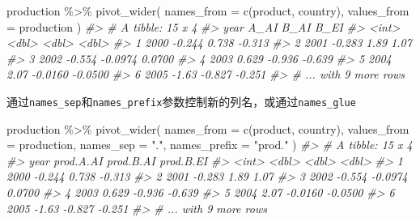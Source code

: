 \documentclass[
]{book}
\newenvironment{Shaded}{\begin{snugshade}}{\end{snugshade}}
\newcommand{\AttributeTok}[1]{\textcolor[rgb]{0.77,0.63,0.00}{#1}}
\newcommand{\CommentTok}[1]{\textcolor[rgb]{0.56,0.35,0.01}{\textit{#1}}}
\newcommand{\FunctionTok}[1]{\textcolor[rgb]{0.00,0.00,0.00}{#1}}
\newcommand{\NormalTok}[1]{#1}
\newcommand{\SpecialCharTok}[1]{\textcolor[rgb]{0.00,0.00,0.00}{#1}}
\newcommand{\StringTok}[1]{\textcolor[rgb]{0.31,0.60,0.02}{#1}}
\begin{document}
\begin{Shaded}
\begin{Highlighting}[]
\NormalTok{production }\SpecialCharTok{\%\textgreater{}\%} \FunctionTok{pivot\_wider}\NormalTok{(}
  \AttributeTok{names\_from =} \FunctionTok{c}\NormalTok{(product, country), }
  \AttributeTok{values\_from =}\NormalTok{ production}
\NormalTok{)}
\CommentTok{\#\textgreater{} \# A tibble: 15 x 4}
\CommentTok{\#\textgreater{}    year   A\_AI    B\_AI    B\_EI}
\CommentTok{\#\textgreater{}   \textless{}int\textgreater{}  \textless{}dbl\textgreater{}   \textless{}dbl\textgreater{}   \textless{}dbl\textgreater{}}
\CommentTok{\#\textgreater{} 1  2000 {-}0.244  0.738  {-}0.313 }
\CommentTok{\#\textgreater{} 2  2001 {-}0.283  1.89    1.07  }
\CommentTok{\#\textgreater{} 3  2002 {-}0.554 {-}0.0974  0.0700}
\CommentTok{\#\textgreater{} 4  2003  0.629 {-}0.936  {-}0.639 }
\CommentTok{\#\textgreater{} 5  2004  2.07  {-}0.0160 {-}0.0500}
\CommentTok{\#\textgreater{} 6  2005 {-}1.63  {-}0.827  {-}0.251 }
\CommentTok{\#\textgreater{} \# ... with 9 more rows}
\end{Highlighting}
\end{Shaded}

通过\texttt{names\_sep}和\texttt{names\_prefix}参数控制新的列名，或通过\texttt{names\_glue}

\begin{Shaded}
\begin{Highlighting}[]
\NormalTok{production }\SpecialCharTok{\%\textgreater{}\%} \FunctionTok{pivot\_wider}\NormalTok{(}
  \AttributeTok{names\_from =} \FunctionTok{c}\NormalTok{(product, country), }
  \AttributeTok{values\_from =}\NormalTok{ production,}
  \AttributeTok{names\_sep =} \StringTok{"."}\NormalTok{,}
  \AttributeTok{names\_prefix =} \StringTok{"prod."}
\NormalTok{)}
\CommentTok{\#\textgreater{} \# A tibble: 15 x 4}
\CommentTok{\#\textgreater{}    year prod.A.AI prod.B.AI prod.B.EI}
\CommentTok{\#\textgreater{}   \textless{}int\textgreater{}     \textless{}dbl\textgreater{}     \textless{}dbl\textgreater{}     \textless{}dbl\textgreater{}}
\CommentTok{\#\textgreater{} 1  2000    {-}0.244    0.738    {-}0.313 }
\CommentTok{\#\textgreater{} 2  2001    {-}0.283    1.89      1.07  }
\CommentTok{\#\textgreater{} 3  2002    {-}0.554   {-}0.0974    0.0700}
\CommentTok{\#\textgreater{} 4  2003     0.629   {-}0.936    {-}0.639 }
\CommentTok{\#\textgreater{} 5  2004     2.07    {-}0.0160   {-}0.0500}
\CommentTok{\#\textgreater{} 6  2005    {-}1.63    {-}0.827    {-}0.251 }
\CommentTok{\#\textgreater{} \# ... with 9 more rows}
\end{Highlighting}
\end{Shaded}
\end{document}
